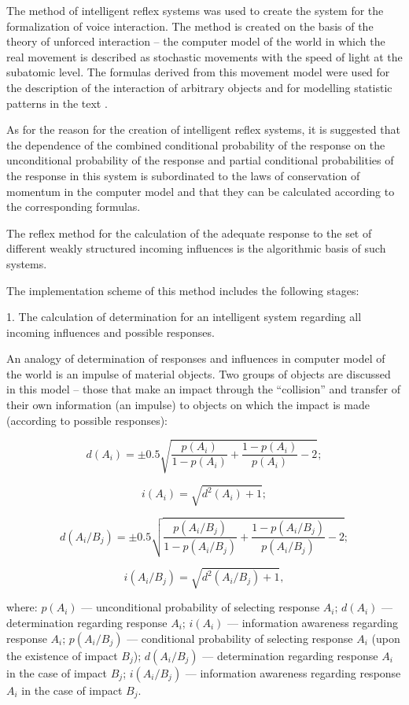 The method of intelligent reflex systems was used to create the system for the formalization of voice interaction. The method is created on the basis of the theory of unforced interaction – the computer model of the world in which the real movement is described as stochastic movements with the speed of light at the subatomic level. The formulas derived from this movement model were used for the description of the interaction of arbitrary objects and for modelling statistic patterns in the text \cite{Teslia_2010}. 

As for the reason for the creation of intelligent reflex systems, it is suggested that the dependence of the combined conditional probability of the response on the unconditional probability of the response and partial conditional probabilities of the response in this system is subordinated to the laws of conservation of momentum in the computer model and that they can be calculated according to the corresponding formulas. 

The reflex method for the calculation of the adequate response to the set of different weakly structured incoming influences is the algorithmic basis of such systems. 

The implementation scheme of this method includes the following stages:

1. The calculation of determination for an intelligent system regarding all incoming influences and possible responses.

An analogy of determination of responses and influences in computer model of the world is an impulse of material objects. Two groups of objects are discussed in this model – those that make an impact through the “collision” and transfer of their own information (an impulse) to objects on which the impact is made (according to possible responses): 

\[
d(A_i)=\pm0.5\sqrt{\frac{p(A_i)}{1-p(A_i)}+\frac{1-p(A_i)}{p(A_i)}-2};
\]

\[
i(A_i)=\sqrt{d^2(A_i)+1};
\]

\[
d(A_i/B_j)=\pm0.5\sqrt{\frac{p(A_i/B_j)}{1-p(A_i/B_j)}+\frac{1-p(A_i/B_j)}{p(A_i/B_j)}-2};
\]

\[
i(A_i/B_j)=\sqrt{d^2(A_i/B_j)+1},
\]

\noindent
where: $p(A_i)$ — unconditional probability of selecting response $A_i$; $d(A_i)$ — determination regarding response $A_i$; $i(A_i)$ — information awareness regarding response $A_i$; $p(A_i/B_j)$ — conditional probability of selecting response $A_i$ (upon the existence of impact $B_j$); $d(A_i/B_j)$ — determination regarding response $A_i$ in the case of impact $B_j$; $i(A_i/B_j)$ — information awareness regarding response $A_i$ in the case of impact $B_j$.

